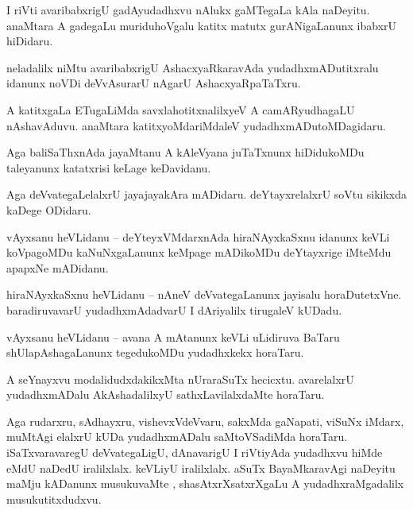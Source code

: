 \documentclass{article}
\begin{document}
\begin{mng}%
I riVti avaribabxrigU gadAyudadhxvu nAlukx gaMTegaLa kAla naDeyitu. anaMtara A gadegaLu 
muriduhoVgalu katitx matutx gurANigaLanunx ibabxrU hiDidaru.
\end{mng}

\begin{mng}%
neladalilx niMtu avaribabxrigU AshacxyaRkaravAda yudadhxmADutitxralu idanunx noVDi deVvAsurarU 
nAgarU AshacxyaRpaTaTxru.
\end{mng}

\begin{mng}%
A katitxgaLa ETugaLiMda savxlahotitxnalilxyeV A camARyudhagaLU nAshavAduvu. anaMtara 
katitxyoMdariMdaleV yudadhxmADutoMDagidaru.
\end{mng}

\begin{mng}%
Aga baliSaThxnAda jayaMtanu A kAleVyana juTaTxnunx hiDidukoMDu taleyanunx katatxrisi keLage 
keDavidanu.
\end{mng}

\begin{mng}%
Aga deVvategaLelalxrU jayajayakAra mADidaru. deYtayxrelalxrU soVtu sikikxda kaDege ODidaru.
\end{mng}


\begin{mng}%
vAyxsanu heVLidanu -- deYteyxVMdarxnAda hiraNAyxkaSxnu idanunx keVLi koVpagoMDu kaNuNxgaLanunx 
keMpage mADikoMDu deYtayxrige iMteMdu apapxNe mADidanu.
\end{mng}

\begin{mng}%
hiraNAyxkaSxnu heVLidanu -- nAneV deVvategaLanunx jayisalu horaDutetxVne. baradiruvavarU 
yudadhxmAdadvarU I dAriyalilx tirugaleV kUDadu.
\end{mng}

\begin{mng}%
vAyxsanu heVLidanu -- avana A mAtanunx keVLi uLidiruva BaTaru shUlapAshagaLanunx tegedukoMDu 
yudadhxkekx horaTaru.
\end{mng}

\begin{mng}%
A seYnayxvu modalidudxdakikxMta nUraraSuTx hecicxtu. avarelalxrU yudadhxmADalu AkAshadalilxyU 
sathxLavilalxdaMte horaTaru.
\end{mng}

\begin{mng}%
Aga rudarxru, sAdhayxru, vishevxVdeVvaru, sakxMda gaNapati, viSuNx iMdarx, muMtAgi elalxrU  kUDa 
yudadhxmADalu saMtoVSadiMda horaTaru. iSaTxvaravaregU deVvategaLigU, dAnavarigU I riVtiyAda 
yudadhxvu hiMde eMdU naDedU iralilxlalx. keVLiyU iralilxlalx. aSuTx BayaMkaravAgi naDeyitu maMju 
kADanunx musukuvaMte , shasAtxrXsatxrXgaLu A yudadhxraMgadalilx musukutitxdudxvu.
\end{mng}
\end{document}
